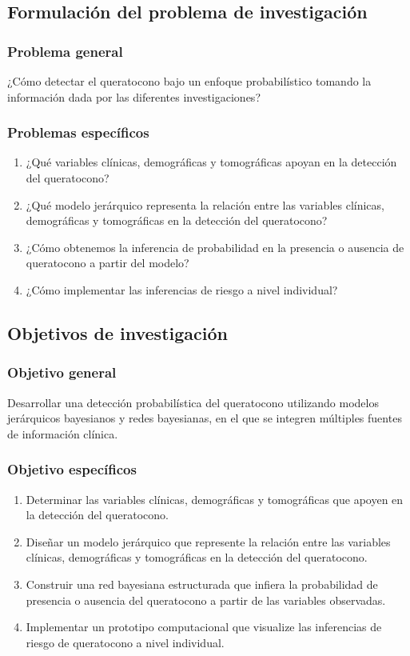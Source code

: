 \subsection{Formulación del problema de investigación}
\subsubsection{Problema general}
¿Cómo detectar el queratocono bajo un enfoque probabilístico tomando la información dada por las diferentes investigaciones?

\subsubsection{Problemas específicos}
\begin{enumerate}
\item ¿Qué variables clínicas, demográficas y tomográficas apoyan en la detección del queratocono?
\item ¿Qué modelo jerárquico representa la relación entre las variables clínicas, demográficas y tomográficas en la detección del queratocono?
\item ¿Cómo obtenemos la inferencia de probabilidad en la presencia o ausencia de queratocono a partir del modelo?
\item ¿Cómo implementar las inferencias de riesgo a nivel individual?
\end{enumerate}


\subsection{Objetivos de investigación}
\subsubsection{Objetivo general}
Desarrollar una detección probabilística del queratocono utilizando modelos jerárquicos bayesianos y redes bayesianas, en el que se integren múltiples fuentes de información clínica.

\subsubsection{Objetivo específicos}
\begin{enumerate}
\item Determinar las variables clínicas, demográficas y tomográficas que apoyen en la detección del queratocono.
\item Diseñar un modelo jerárquico que represente la relación entre las variables clínicas, demográficas y tomográficas en la detección del queratocono.
\item Construir una red bayesiana estructurada que infiera la probabilidad de presencia o ausencia del queratocono a partir de las variables observadas.
\item Implementar un prototipo computacional que visualize las inferencias de riesgo de queratocono a nivel individual.
\end{enumerate}

